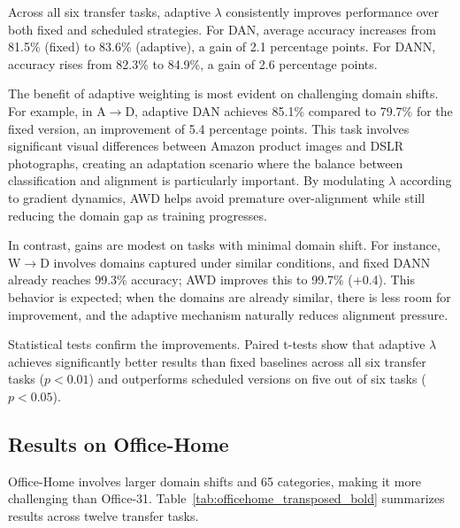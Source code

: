 \documentclass[pdflatex,sn-mathphys-num]{sn-jnl}
\theoremstyle{thmstyleone}
\theoremstyle{thmstyletwo}
\theoremstyle{thmstylethree}
\begin{document}
Across all six transfer tasks, adaptive $\lambda$ consistently improves performance over both fixed and scheduled strategies.
For DAN, average accuracy increases from 81.5\% (fixed) to 83.6\% (adaptive), a gain of 2.1 percentage points.
For DANN, accuracy rises from 82.3\% to 84.9\%, a gain of 2.6 percentage points.

The benefit of adaptive weighting is most evident on challenging domain shifts. For example, in A$\to$D, adaptive DAN achieves 85.1\% compared to 79.7\% for the fixed version, an improvement of 5.4 percentage points. This task involves significant visual differences between Amazon product images and DSLR photographs, creating an adaptation scenario where the balance between classification and alignment is particularly important. By modulating $\lambda$ according to gradient dynamics, AWD helps avoid premature over-alignment while still reducing the domain gap as training progresses.

In contrast, gains are modest on tasks with minimal domain shift. For instance, W$\to$D involves domains captured under similar conditions, and fixed DANN already reaches 99.3\% accuracy; AWD improves this to 99.7\% (+0.4). This behavior is expected; when the domains are already similar, there is less room for improvement, and the adaptive mechanism naturally reduces alignment pressure.

Statistical tests confirm the improvements. Paired t-tests show that adaptive $\lambda$ achieves significantly better results than fixed baselines across all six transfer tasks ($p < 0.01$) and outperforms scheduled versions on five out of six tasks ($p < 0.05$).

\subsection{Results on Office-Home}

Office-Home involves larger domain shifts and 65 categories, making it more challenging than Office-31. Table~\ref{tab:officehome_transposed_bold} summarizes results across twelve transfer tasks.
\end{document}
